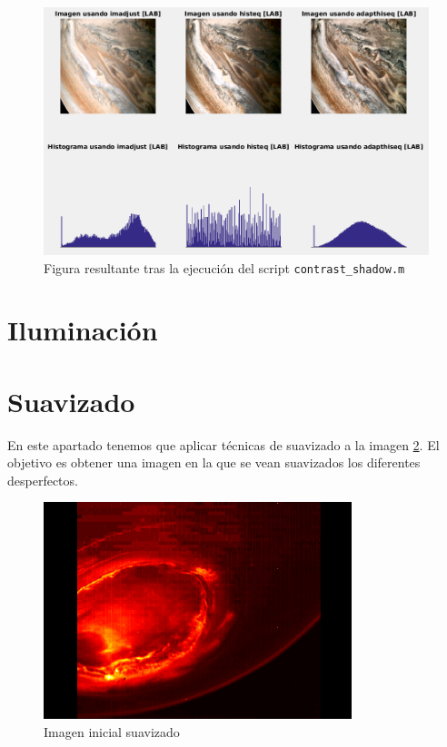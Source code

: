 \documentclass[12pt]{article}
\begin{document}
	\begin{figure}[h]
		\begin{center}
			\includegraphics[width=1\textwidth]{img/contrast_shadow.png}
			\caption{Figura resultante tras la ejecución del script \texttt{contrast\_shadow.m}}
			\label{img: contrast shadow}
		\end{center}
	\end{figure}
	
	
	\pagebreak
	
	\section{Iluminación}
	
	\pagebreak
	
	\section{Suavizado}
	
	\noindent En este apartado tenemos que aplicar técnicas de suavizado a la imagen \ref{img: suavizado src}. El objetivo es obtener una imagen en la que se vean suavizados los diferentes desperfectos.
	
	\begin{figure}[h]
		\begin{center}
			\includegraphics[width=0.8\textwidth]{img/suavizado.jpg}
			\caption{Imagen inicial suavizado}
			\label{img: suavizado src}
		\end{center}
	\end{figure}
\end{document}
